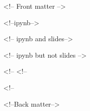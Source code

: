 <!-- Front matter -->




\endif


\endif


\endif

 <!--ipynb-->

 <!-- ipynb and slides-->

\else <!-- ipynb but not slides -->

\endif 
\else <!--%
 <!--%

\endif



\else

\endif
\else <!--%

\endif
\endif

<!--Back matter-->




